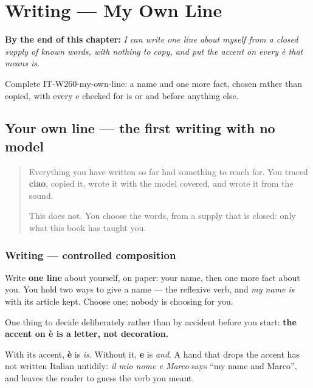 
\chapter{Writing --- My Own Line}
\label{ch:it-my-own-line}

\begin{chapteropening}
\textbf{By the end of this chapter:} \emph{I can write one line about myself from a closed supply of known words, with nothing to copy, and put the accent on every è that means is.}

Complete IT-W260-my-own-line: a name and one more fact, chosen rather than copied, with every e checked for is or and before anything else.
\end{chapteropening}

\section[(my own line)]{Your own line — the first writing with no model}

\label{lesson:IT-W260-my-own-line}



\begin{quote}
Everything you have written so far had something to reach for. You traced \textbf{ciao}, copied it, wrote it with the model covered, and wrote it from the sound.

This does not. You choose the words, from a supply that is closed: only what this book has taught you.
\end{quote}

\subsection*{Writing — controlled composition}
Write \textbf{one line} about yourself, on paper: your name, then one more fact about you. You hold two ways to give a name — the reflexive verb, and \emph{my name is} with its article kept. Choose one; nobody is choosing for you.

One thing to decide deliberately rather than by accident before you start: \textbf{the accent on è is a letter, not decoration.}

With its accent, \textbf{è} is \emph{is}. Without it, \textbf{e} is \emph{and}. A hand that drops the accent has not written Italian untidily: \emph{il mio nome e Marco} says \textquotedblleft{}my name and Marco\textquotedblright{}, and leaves the reader to guess the verb you meant.

